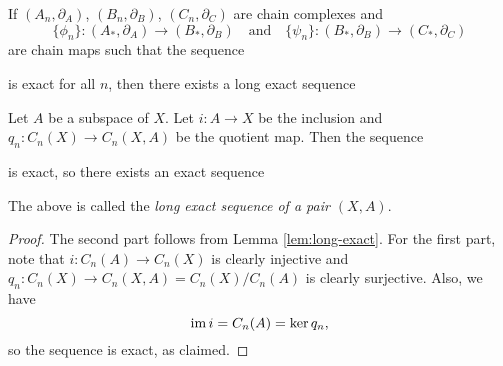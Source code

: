 \begin{lemma}\label{lem:long-exact}
  If $(A_n, \partial_A)$, $(B_n, \partial_B)$, $(C_n, \partial_C)$ are chain complexes and
  \[
    \{\phi_n\} : (A_*, \partial_A) \to (B_*, \partial_B)
    \quad \text{and} \quad
    \{\psi_n\} : (B_*, \partial_B) \to (C_*, \partial_C)
  \]
  are chain maps such that the sequence
  \begin{center}
  \end{center}
  is exact for all $n$, then there exists a
  long exact sequence
  \begin{center}
  \end{center}
\end{lemma}

\begin{corollary}
  Let $A$ be a subspace of $X$.
  Let $i : A \to X$ be the inclusion and
  $q_n : C_n(X) \to C_n(X, A)$ be the quotient map.
  Then the sequence
  \begin{center}
  \end{center}
  is exact, so there exists an exact sequence
  \begin{center}
  \end{center}
  The above is called the \emph{long exact sequence of a pair $(X, A)$}.
\end{corollary}

\begin{proof}
  The second part follows from
  Lemma \ref{lem:long-exact}. For the first part,
  note that $i : C_n(A) \to C_n(X)$ is clearly
  injective and $q_n : C_n(X) \to C_n(X, A) = C_n(X) / C_n(A)$
  is clearly surjective. Also, we have
  \[
    \operatorname{im} i = C_n(A) = \ker q_n,
  \]
  so the sequence is exact, as claimed.
\end{proof}

